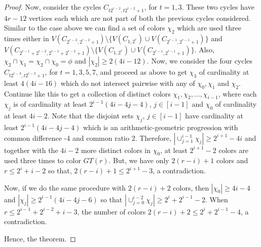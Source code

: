 \documentclass[12pt]{article}
\begin{document}
\begin{proof}
Now, consider the cycles 
$C_{t2^{r-2},t2^{r-2}+1}$, for $t=1,3$. These two cycles have $4r-12$ vertices each which are not part of both the previous cycles considered. Similar to the case above we can find a set of colors $\chi_2$ which are used three times either in $V(C_{2^{r-2},2^{r-2}+1}) \setminus \{ V (C_{1,2^r})\cup V( C_{2^{r-1},2^{r-1}+1})\}$ and $V(C_{2^{r-1}+2^{r-2},2^{r-1}+2^{r-2}+1}) \setminus \{V(C_{1,2^r}) \cup V(C_{2^{r-1},2^{r-1}+1})\}$. Also, $ \chi_2 \cap \chi_1 = \chi_2 \cap \chi_0 = \phi$ and $|\chi_2| \geq 2(4i - 12)$. Now, we consider the four cycles 
$C_{t2^{r-3},t2^{r-3}+1}$, for $t=1,3,5,7$, and proceed as above to get $\chi_3$ of cardinality at least $4(4i - 16)$ which do not intersect pairwise with any of $\chi_0,\chi_1$ and $\chi_2$. Continue like this to get a collection of distinct colors $\chi_1, \chi_2,\ldots,\chi_{i-1}$, where each $\chi_j$ is of cardinality at least $2^{i-1}(4i - 4j - 4)$, $j \in [i-1]$ and $\chi_0$ of cardinality at least $4i-2$. Note that the disjoint sets $\chi_j$, $j \in [i-1]$ have cardinality at least $2^{i-1}(4i - 4j - 4)$ which is an arithmetic-geometric progression with common difference -4 and common ratio 2. Therefore, $|\cup_{j=1}^{i-1}\chi_j |\geq 2^{i+1}-4i$ and together with the $4i-2$ more distinct colors in $\chi_0$, at least $2^{i+1}-2$ colors are used three times to color $GT(r)$. But, we have only $2(r-i)+1$ colors and $r\leq 2^i+i-2$ so that, $2(r-i)+1 \leq 2^{i+1}-3$, a contradiction. 


Now, if we do the same procedure with $2(r-i)+2$ colors, then $|\chi_0| \geq 4i - 4$ and $|\chi_j| \geq 2^{i-1}(4i - 4j - 6)$ so that $|\cup_{j=0}^{i-2}\chi_j| \geq 2^{i}+2^{i-1}-2$. When $r \leq 2^{i-1}+2^{i-2} + i - 3$, the number of colors $2(r-i)+2 \leq 2^{i}+2^{i-1}-4$, a contradiction. \par

Hence, the theorem.
\end{proof}
\end{document}
